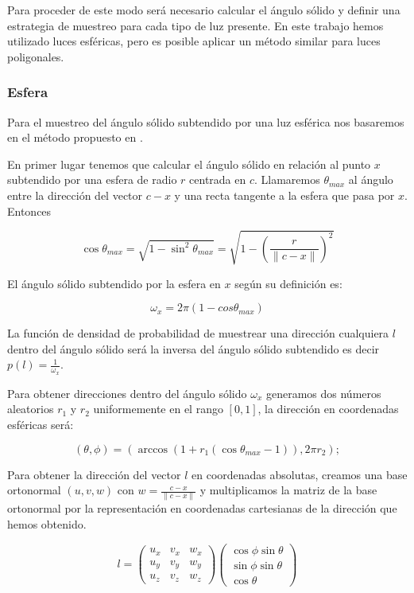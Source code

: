 \medskip

Para proceder de este modo será necesario calcular el ángulo sólido y definir una estrategia de muestreo para cada tipo de luz presente. En este trabajo hemos utilizado luces esféricas, pero es posible aplicar un método similar para luces poligonales.

\subsubsection{Esfera}

Para el muestreo del ángulo sólido subtendido por una luz esférica nos basaremos en el método propuesto en \cite{Shirley1996}.

\medskip

En primer lugar tenemos que calcular el ángulo sólido en relación al punto $x$ subtendido por una esfera de radio $r$ centrada en $c$. Llamaremos $\theta_{max}$ al ángulo entre la dirección del vector $c - x$ y una recta tangente a la esfera que pasa por $x$. Entonces

\begin{equation}
\cos \theta_{max} = \sqrt{1 - \sin^2 \theta_{max}} = \sqrt{ 1 - \left(\frac{r}{\lVert c - x \rVert} \right)^2 }
\end{equation}

El ángulo sólido subtendido por la esfera en $x$ según su definición es:

\begin{equation}
\omega_x = 2\pi (1 - cos \theta_{max})
\end{equation}

La función de densidad de probabilidad de muestrear una dirección cualquiera $l$ dentro del ángulo sólido será la inversa del ángulo sólido subtendido es decir $p(l) = \frac{1}{\omega_x}$.

\medskip

Para obtener direcciones dentro del ángulo sólido $\omega_x$ generamos dos números aleatorios $r_1$ y $r_2$ uniformemente en el rango $[0, 1]$, la dirección en coordenadas esféricas será:

\begin{equation}
(\theta, \phi) = (\arccos (1 + r_1 (\cos \theta_{max} - 1)), 2\pi r_2);
\end{equation}

\clearpage

Para obtener la dirección del vector $l$ en coordenadas absolutas, creamos una base ortonormal $(u, v, w)$ con $w = \frac{c - x}{\lVert c - x \rVert}$ y multiplicamos la matriz de la base ortonormal por la representación en coordenadas cartesianas de la dirección que hemos obtenido.

\begin{equation}
l = \begin{pmatrix}
u_x & v_x & w_x \\
u_y & v_y & w_y \\
u_z & v_z & w_z
\end{pmatrix}
\begin{pmatrix}
\cos \phi \sin \theta \\
\sin \phi \sin \theta \\
\cos \theta
\end{pmatrix}
\end{equation}






